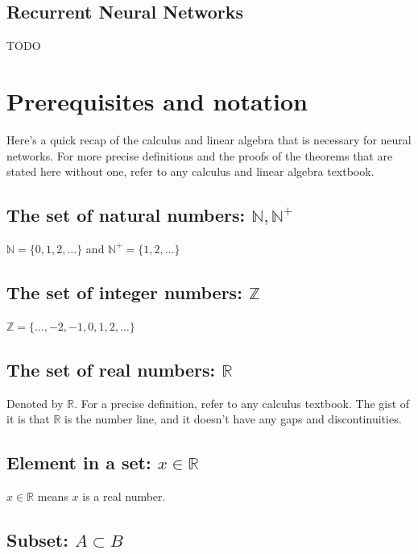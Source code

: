 \documentclass[titlepage]{article}
\begin{document}
\newpage

    \subsection{Recurrent Neural Networks}

      TODO

\newpage

  \appendix

    \section{Prerequisites and notation}

      Here's a quick recap of the calculus and linear algebra that is necessary
      for neural networks. For more precise definitions and the proofs of the
      theorems that are stated here without one, refer to any calculus and
      linear algebra textbook.

      \subsection{The set of natural numbers: $\mathbb{N}, \mathbb{N}^+$}
        $\mathbb{N} = \{ 0, 1, 2, \ldots \}$ and
        $\mathbb{N}^+ = \{ 1, 2, \ldots \}$

      \subsection{The set of integer numbers: $\mathbb{Z}$}
        $\mathbb{Z} = \{ \ldots, -2, -1, 0, 1, 2, \ldots \}$

      \subsection{The set of real numbers: $\mathbb{R}$}

        Denoted by $\mathbb{R}$. For a precise definition, refer to any
        calculus textbook. The gist of it is that $\mathbb{R}$ is the number
        line, and it doesn't have any gaps and discontinuities.

      \subsection{Element in a set: $x \in \mathbb{R}$}

        $x \in \mathbb{R}$ means $x$ is a real number.

      \subsection{Subset: $A \subset B$}
\end{document}

